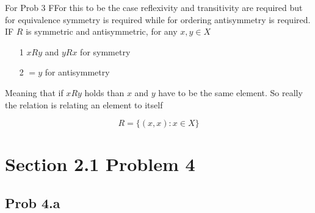 \documentclass{report}
\begin{document}
\begin{RemarkWithLily}{For Prob 3}
  FFor this to be the case reflexivity and transitivity are required but for equivalence symmetry is required while for 
  ordering antisymmetry is required.    
  \bigskip 
  IF $R$ is symmetric and antisymmetric, for any $x,y \in X$
  \begin{itemize}
    \item [1] $xRy$ and $yRx$ for symmetry 
    \item [2] $=y$ for antisymmetry
  \end{itemize}                    
  Meaning that if $xRy$ holds than $x$ and $y$ have to be the same element. So really the relation is relating an element 
  to itself 
  
  \bigskip 
  \[ R = \{ (x,x) : x \in X \}\] 
\end{RemarkWithLily}

\section*{Section 2.1 Problem 4}



\subsection*{Prob 4.a}
\end{document}
